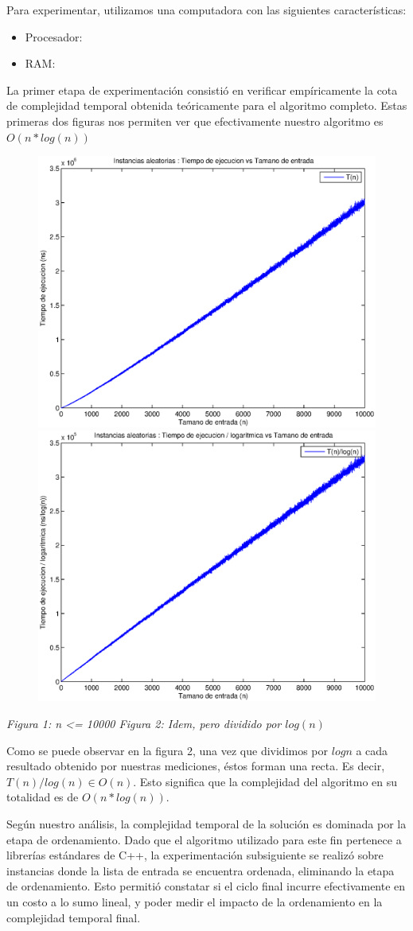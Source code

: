 Para experimentar, utilizamos una computadora con las siguientes características:

\begin{itemize}
 \item Procesador: 
 \item RAM: 
\end{itemize}

La primer etapa de experimentación consistió en verificar empíricamente la cota de complejidad temporal obtenida teóricamente para el algoritmo completo. Estas primeras dos figuras nos permiten ver que efectivamente nuestro algoritmo es $O(n * log(n))$

\begin{figure}[H]
    \includegraphics[width=0.5\linewidth]{problema1/graficos/problema1_aleatoria_10000.eps}
    \includegraphics[width=0.5\linewidth]{problema1/graficos/problema1_aleatoria_10000_div_logn.eps}
\end{figure}
\emph{\hspace{2,5cm}Figura 1: n <= 10000 \hspace{3cm}Figura 2: Idem, pero dividido por $log(n)$}

Como se puede observar en la figura 2, una vez que dividimos por $log n$ a cada resultado obtenido por nuestras mediciones, éstos forman una recta. Es decir, $T(n)/log(n) \in O(n)$. Esto significa que la complejidad del algoritmo en su totalidad es de $O(n * log(n))$.

Según nuestro análisis, la complejidad temporal de la solución es dominada por la etapa de ordenamiento. Dado que el algoritmo utilizado para este fin pertenece a librerías estándares de C++, la experimentación subsiguiente se realizó sobre instancias donde la lista de entrada se encuentra ordenada, eliminando la etapa de ordenamiento. Esto permitió constatar si el ciclo final incurre efectivamente en un costo a lo sumo lineal, y poder medir el impacto de la ordenamiento en la complejidad temporal final.

